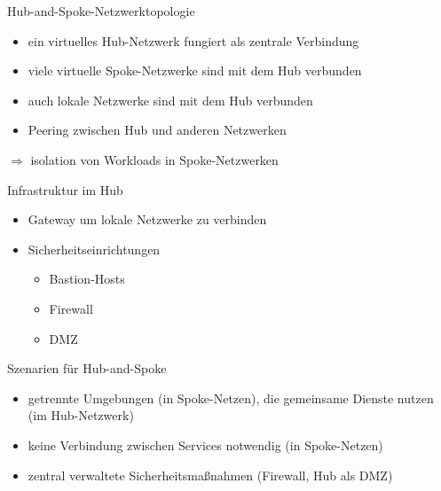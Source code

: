 

\begin{flashcard}[]{Hub-and-Spoke-Netzwerktopologie}
  \begin{itemize}
    \item ein virtuelles Hub-Netzwerk fungiert als zentrale Verbindung
    \item viele virtuelle Spoke-Netzwerke sind mit dem Hub verbunden
    \item auch lokale Netzwerke sind mit dem Hub verbunden
    \item Peering zwischen Hub und anderen Netzwerken
  \end{itemize}
  $\Rightarrow$ isolation von Workloads in Spoke-Netzwerken
\end{flashcard}

\begin{flashcard}[]{Infrastruktur im Hub}
  \begin{itemize}
    \item Gateway um lokale Netzwerke zu verbinden
    \item Sicherheitseinrichtungen
      \begin{itemize}
        \item Bastion-Hosts
        \item Firewall
        \item DMZ
      \end{itemize}
  \end{itemize}
\end{flashcard}

\begin{flashcard}[]{Szenarien für Hub-and-Spoke}
  \begin{itemize}
    \item getrennte Umgebungen (in Spoke-Netzen), die gemeinsame Dienste nutzen (im Hub-Netzwerk)
    \item keine Verbindung zwischen Services notwendig (in Spoke-Netzen)
    \item zentral verwaltete Sicherheitsmaßnahmen (Firewall, Hub als DMZ)
  \end{itemize}
\end{flashcard}


